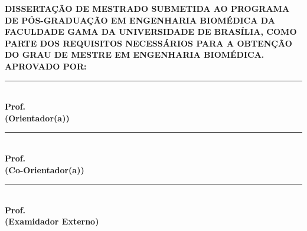\begin{folhadeaprovacao}
\begin{center}
    \vspace*{0in}
	{\textbf{\imprimirinstituicao}}
	\par
	{\textbf{\imprimirdepartamento}}

	\vspace{0.5 in}
	{\textbf{\large \imprimirtitulo}}
    	\vspace{0.25 in}
    	\par
         {\textbf{\large \imprimirautor}}
    	\vspace{0.25 in}
\end{center}
\textbf{DISSERTAÇÃO DE MESTRADO SUBMETIDA AO PROGRAMA DE PÓS-GRADUAÇÃO EM ENGENHARIA BIOMÉDICA DA FACULDADE GAMA DA
UNIVERSIDADE DE BRASÍLIA, COMO PARTE DOS REQUISITOS NECESSÁRIOS PARA A OBTENÇÃO DO GRAU DE MESTRE EM
ENGENHARIA BIOMÉDICA.}
\flushleft	
	\vspace{0.5 in}    
    \textbf{APROVADO POR:}\\
    \vspace{0.5 in}    
    \rule{10cm}{.1mm}\\
    {\textbf{Prof. \imprimirorientador} \\ \textbf{(Orientador(a))} }\\
    \vspace{0.5 in}    
   \rule{10cm}{.1mm}\\ 
   {\textbf{Prof. \imprimirmembroCoorientador} \\ \textbf{(Co-Orientador(a))}}\\
    \vspace{0.5 in}    
   \rule{10cm}{.1mm}\\
    {\textbf{Prof. \imprimirmembroconvidadodois} \\ \textbf{(Examidador Externo)}}\\
    
    \end{folhadeaprovacao}
